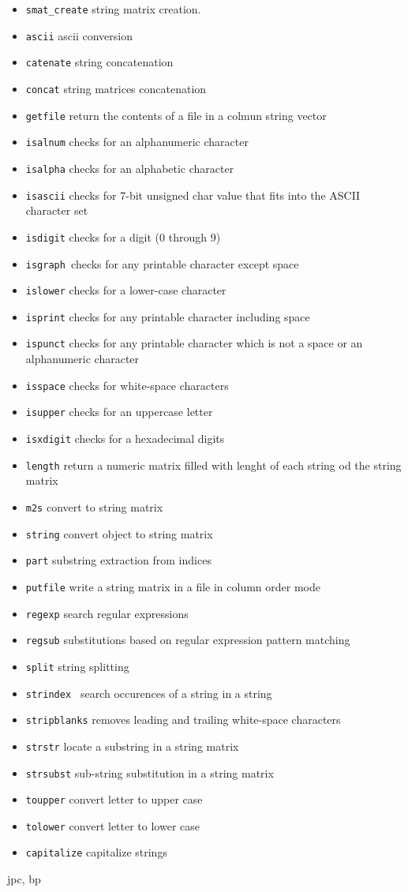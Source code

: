 \begin{itemize}
\item \verb+smat_create+ string matrix creation.
\item \verb+ascii+ ascii conversion 
\item \verb+catenate+ string concatenation 
\item \verb+concat+ string matrices concatenation 
\item \verb+getfile+ return the contents of a file in a colmun string vector 
\item \verb+isalnum+ checks for an alphanumeric character 
\item \verb+isalpha+ checks for an alphabetic character
\item \verb+isascii+ checks for 7-bit unsigned char value that fits into the ASCII character set 
\item \verb+isdigit+ checks for a digit (0 through 9) 
\item \verb+isgraph +checks for any printable character except space 
\item \verb+islower+ checks for a lower-case character 
\item \verb+isprint+  checks for any printable character including space 
\item \verb+ispunct+ checks for any printable character which is not a space or an alphanumeric character 
\item \verb+isspace+  checks for white-space characters 
\item \verb+isupper+  checks for an uppercase letter 
\item \verb+isxdigit+  checks for a hexadecimal digits 
\item \verb+length+  return a numeric matrix filled with lenght of each string od the string matrix
\item \verb+m2s+  convert to string matrix 
\item \verb+string+  convert object to string matrix 
\item \verb+part+ substring extraction from indices 
\item \verb+putfile+  write a string matrix in a file in column order mode 
\item \verb+regexp+  search regular expressions 
\item \verb+regsub+ substitutions based on regular expression pattern matching 
\item \verb+split+ string splitting 
\item \verb+strindex + search occurences of a string in a string 
\item \verb+stripblanks+ removes leading and trailing white-space characters 
\item \verb+strstr+  locate a substring in a string matrix 
\item \verb+strsubst+ sub-string substitution in a string matrix 
\item \verb+toupper+ convert letter to upper case 
\item \verb+tolower+  convert letter to lower case 
\item \verb+capitalize+ capitalize strings 
\end{itemize}

\begin{manseealso}

\end{manseealso}

\begin{authors}
   jpc, bp
\end{authors}
